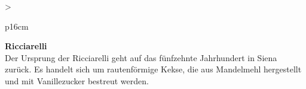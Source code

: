 \documentclass[
  beamerpaper,
  DIV=11,
  numbers=noendperiod,
  aspectratio=54]{scrreprt}
\begin{document}
\begin{table}

\caption{\label{tbl-panel-dolci}Ricciarelli alle
Mandorle}\begin{minipage}[t]{\linewidth}

\tabularnewline

\fontsize{16}{18}\selectfont
\begin{tabular}{>{\raggedright\arraybackslash}p{16cm}}
\toprule
\begingroup\fontsize{18}{20}\selectfont \textbf{Ricciarelli}\endgroup\\
\midrule
Der Ursprung der Ricciarelli geht auf das fünfzehnte Jahrhundert in Siena zurück. Es handelt sich um rautenförmige Kekse, die aus Mandelmehl hergestellt und mit Vanillezucker bestreut werden.\\
\bottomrule
\end{tabular}

\end{minipage}%
\newline
\begin{minipage}[t]{\linewidth}


\end{minipage}%

\end{table}
\end{document}
